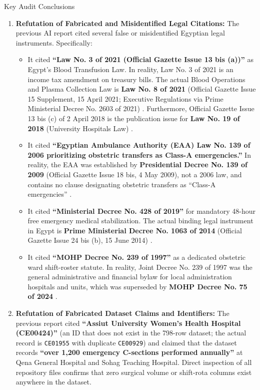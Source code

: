 \documentclass[10pt,a4paper]{article}
\begin{document}
\begin{correctionbox}{Key Audit Conclusions}
\begin{enumerate}
    \item \textbf{Refutation of Fabricated and Misidentified Legal Citations:} The previous AI report cited several false or misidentified Egyptian legal instruments. Specifically:
    \begin{itemize}
        \item It cited \textbf{``Law No. 3 of 2021 (Official Gazette Issue 13 bis (a))''} as Egypt's Blood Transfusion Law. In reality, Law No. 3 of 2021 is an income tax amendment on treasury bills. The actual Blood Operations and Plasma Collection Law is \textbf{Law No. 8 of 2021} (Official Gazette Issue 15 Supplement, 15 April 2021; Executive Regulations via Prime Ministerial Decree No. 2603 of 2021) \cite{egypt_law_8_2021_blood}. Furthermore, Official Gazette Issue 13 bis (c) of 2 April 2018 is the publication issue for \textbf{Law No. 19 of 2018} (University Hospitals Law) \cite{egypt_law_19_2018_univ}.
        \item It cited \textbf{``Egyptian Ambulance Authority (EAA) Law No. 139 of 2006 prioritizing obstetric transfers as Class-A emergencies.''} In reality, the EAA was established by \textbf{Presidential Decree No. 139 of 2009} (Official Gazette Issue 18 bis, 4 May 2009), not a 2006 law, and contains no clause designating obstetric transfers as ``Class-A emergencies'' \cite{egypt_pres_decree_139_2009_eaa}.
        \item It cited \textbf{``Ministerial Decree No. 428 of 2019''} for mandatory 48-hour free emergency medical stabilization. The actual binding legal instrument in Egypt is \textbf{Prime Ministerial Decree No. 1063 of 2014} (Official Gazette Issue 24 bis (b), 15 June 2014) \cite{egypt_pm_decree_1063_2014}.
        \item It cited \textbf{``MOHP Decree No. 239 of 1997''} as a dedicated obstetric ward shift-roster statute. In reality, Joint Decree No. 239 of 1997 was the general administrative and financial bylaw for local administration hospitals and units, which was superseded by \textbf{MOHP Decree No. 75 of 2024} \cite{egypt_mohp_decree_75_2024}.
    \end{itemize}
    \item \textbf{Refutation of Fabricated Dataset Claims and Identifiers:} The previous report cited \textbf{``Assiut University Women's Health Hospital (CE00424)''} (an ID that does not exist in the 798-row dataset; the actual record is \texttt{CE01955} with duplicate \texttt{CE00929}) and claimed that the dataset records \textbf{``over 1,200 emergency C-sections performed annually''} at Qena General Hospital and Sohag Teaching Hospital. Direct inspection of all repository files confirms that zero surgical volume or shift-rota columns exist anywhere in the dataset.

\end{enumerate}
\end{correctionbox}
\end{document}
